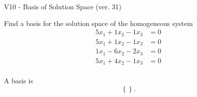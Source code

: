 \begin{exercise}
  \begin{exerciseTitle}V10 - Basis of Solution Space (ver. 31)\end{exerciseTitle}
  \begin{exerciseStatement}
    Find a basis for the solution space of the homogeneous system 
\begin{align*}
 5 x_ 1 + 1 x_ 2 -1 x_ 3 &= 0  \\ 
  5 x_ 1 + 1 x_ 2 -1 x_ 3 &= 0  \\ 
  1 x_ 1 -6 x_ 2 -2 x_ 3 &= 0  \\ 
  5 x_ 1 + 4 x_ 2 -1 x_ 3 &= 0  \\ 
 \end{align*}


 
  \end{exerciseStatement}

  \begin{exerciseAnswer}
   A basis is   
\[\left\{\right\}.\]

  


  \end{exerciseAnswer}
\end{exercise}